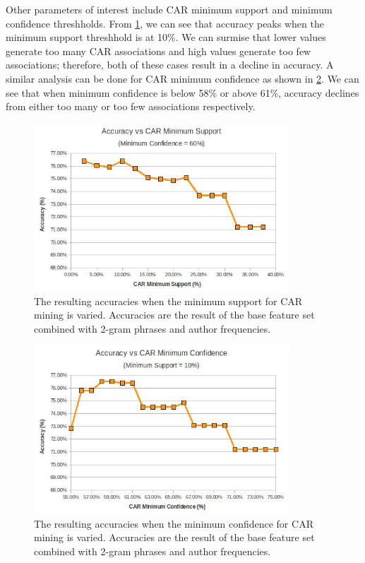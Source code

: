 \documentclass[]{report}
\begin{document}
Other parameters of interest include CAR minimum support and minimum confidence threshholds.  From \ref{fig:CARMinSup}, we can see that accuracy peaks when the minimum support threshhold is at 10\%.  We can surmise that lower values generate too many CAR associations and high values generate too few associations; therefore, both of these cases result in a decline in accuracy.  A similar analysis can be done for CAR minimum confidence as shown in \ref{fig:CARMinConf}.  We can see that when minimum confidence is below 58\% or above 61\%, accuracy declines from either too many or too few associations respectively. 


\begin{figure}[h]
\centering
\includegraphics[width=3.77in]{AccuracyVsCARMinimumSupport.jpg}
\caption{The resulting accuracies when the minimum support for CAR mining is varied.  Accuracies are the result of the base feature set combined with 2-gram phrases and author frequencies.}
\label{fig:CARMinSup}
\end{figure}

\begin{figure}[H]
\centering
\includegraphics[width=3.77in]{AccuracyVsCARMinimumConfidence.jpg}
\caption{The resulting accuracies when the minimum confidence for CAR mining is varied.  Accuracies are the result of the base feature set combined with 2-gram phrases and author frequencies.}
\label{fig:CARMinConf}
\end{figure}
\end{document}

